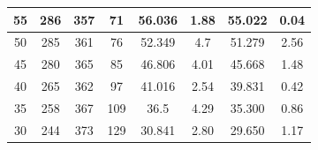 \begin{landscape}
\begin{table}[]
\begin{tabular}{|c|c|c|c|c|c|c|c|}
55                                                                        & 286                                                           & 357                                                            & 71                                                             & 56.036                                                              & 1.88                  & 55.022           & 0.04                  \\ \hline
50                                                                        & 285                                                           & 361                                                            & 76                                                             & 52.349                                                              & 4.7                   & 51.279           & 2.56                  \\ \hline
45                                                                        & 280                                                           & 365                                                            & 85                                                             & 46.806                                                              & 4.01                  & 45.668           & 1.48                  \\ \hline
40                                                                        & 265                                                           & 362                                                            & 97                                                             & 41.016                                                              & 2.54                  & 39.831           & 0.42                  \\ \hline
35                                                                        & 258                                                           & 367                                                            & 109                                                            & 36.5                                                                & 4.29                  & 35.300           & 0.86                  \\ \hline
30                                                                        & 244                                                           & 373                                                            & 129                                                            & 30.841                                                              & 2.80                  & 29.650           & 1.17                  \\ \hline

\end{tabular}
\end{table}
\end{landscape}
